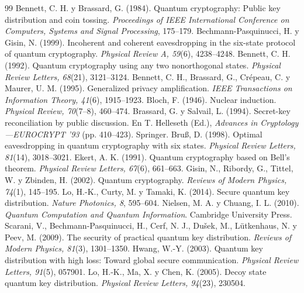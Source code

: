 \begin{thebibliography}{99}
 Bennett, C. H. y Brassard, G. (1984). Quantum cryptography: Public key distribution and coin tossing. \emph{Proceedings of IEEE International Conference on Computers, Systems and Signal Processing}, 175--179.
 Bechmann-Pasquinucci, H. y Gisin, N. (1999). Incoherent and coherent eavesdropping in the six-state protocol of quantum cryptography. \emph{Physical Review A, 59}(6), 4238--4248.
 Bennett, C. H. (1992). Quantum cryptography using any two nonorthogonal states. \emph{Physical Review Letters, 68}(21), 3121--3124.
 Bennett, C. H., Brassard, G., Cr\'epeau, C. y Maurer, U. M. (1995). Generalized privacy amplification. \emph{IEEE Transactions on Information Theory, 41}(6), 1915--1923.
 Bloch, F. (1946). Nuclear induction. \emph{Physical Review, 70}(7--8), 460--474.
 Brassard, G. y Salvail, L. (1994). Secret-key reconciliation by public discussion. En T. Helleseth (Ed.), \emph{Advances in Cryptology---EUROCRYPT '93} (pp. 410--423). Springer.
 Bru\ss, D. (1998). Optimal eavesdropping in quantum cryptography with six states. \emph{Physical Review Letters, 81}(14), 3018--3021.
 Ekert, A. K. (1991). Quantum cryptography based on Bell's theorem. \emph{Physical Review Letters, 67}(6), 661--663.
 Gisin, N., Ribordy, G., Tittel, W. y Zbinden, H. (2002). Quantum cryptography. \emph{Reviews of Modern Physics, 74}(1), 145--195.
 Lo, H.-K., Curty, M. y Tamaki, K. (2014). Secure quantum key distribution. \emph{Nature Photonics, 8}, 595--604.
 Nielsen, M. A. y Chuang, I. L. (2010). \emph{Quantum Computation and Quantum Information}. Cambridge University Press.
 Scarani, V., Bechmann-Pasquinucci, H., Cerf, N. J., Dušek, M., Lütkenhaus, N. y Peev, M. (2009). The security of practical quantum key distribution. \emph{Reviews of Modern Physics, 81}(3), 1301--1350.
 Hwang, W.-Y. (2003). Quantum key distribution with high loss: Toward global secure communication. \emph{Physical Review Letters, 91}(5), 057901.
 Lo, H.-K., Ma, X. y Chen, K. (2005). Decoy state quantum key distribution. \emph{Physical Review Letters, 94}(23), 230504.

\end{thebibliography}
